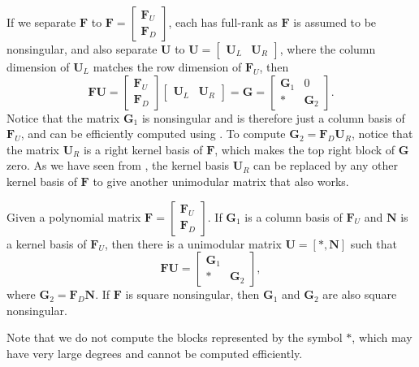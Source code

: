If we separate $\mathbf{F}$ to $\mathbf{F}=\begin{bmatrix}\mathbf{F}_{U}\\
\mathbf{F}_{D}
\end{bmatrix}$, each has full-rank as $\mathbf{F}$ is assumed to be nonsingular,
and also separate $\mathbf{U}$ to $\mathbf{U}=\begin{bmatrix}\mathbf{U}_{L} & \mathbf{U}_{R}\end{bmatrix}$,
where the column dimension of $\mathbf{U}_{L}$ matches the row dimension
of $\mathbf{F}_{U}$, then 
\[
\mathbf{F}\mathbf{U}=\begin{bmatrix}\mathbf{F}_{U}\\
\mathbf{F}_{D}
\end{bmatrix}\begin{bmatrix}\mathbf{U}_{L} & \mathbf{U}_{R}\end{bmatrix}=\mathbf{G}=\begin{bmatrix}\mathbf{G}_{1} & 0\\
* & \mathbf{G}_{2}
\end{bmatrix}.
\]
 Notice that the matrix $\mathbf{G}_{1}$ is nonsingular and is therefore
just a column basis of $\mathbf{F}_{U}$, and can be efficiently computed
using . To compute $\mathbf{G}_{2}=\mathbf{F}_{D}\mathbf{U}_{R}$,
notice that the matrix $\mathbf{U}_{R}$ is a right kernel basis\textbf{
}of $\mathbf{F}$, which makes the top right block of $\mathbf{G}$
zero. As we have seen from ,
the kernel basis $\mathbf{U}_{R}$ can be replaced by any other kernel
basis of $\mathbf{F}$ to give another unimodular matrix that also
works. 
\begin{lem}
\label{lem:oneStepHermiteDiagonal}Given a polynomial matrix $\mathbf{F}=\begin{bmatrix}\mathbf{F}_{U}\\
\mathbf{F}_{D}
\end{bmatrix}$. If $\mathbf{G}_{1}$ is a column basis of $\mathbf{F}_{U}$ and
$\mathbf{N}$ is a kernel basis of $\mathbf{F}_{U}$, then there is
a unimodular matrix $\mathbf{U}=\left[*,\mathbf{N}\right]$ such that
\[
\mathbf{F}\mathbf{U}=\begin{bmatrix}\mathbf{G}_{1}\\
* & \mathbf{G}_{2}
\end{bmatrix},
\]
 where $\mathbf{G}_{2}=\mathbf{F}_{D}\mathbf{N}$.  If $\mathbf{F}$
is square nonsingular, then $\mathbf{G}_{1}$ and $\mathbf{G}_{2}$
are also square nonsingular.
\end{lem}
Note that we do not compute the blocks represented by the symbol $*$,
which may have very large degrees and cannot be computed efficiently.

